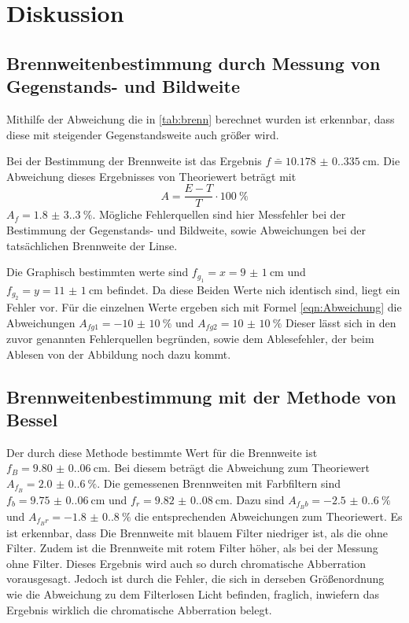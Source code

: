 \section{Diskussion}
\label{sec:Diskussion}
\subsection{Brennweitenbestimmung durch Messung von Gegenstands- und Bildweite}
Mithilfe der Abweichung die in \ref{tab:brenn} berechnet wurden ist erkennbar, dass diese mit steigender Gegenstandsweite auch größer wird.

\noindent Bei der Bestimmung der Brennweite ist das Ergebnis $f \bar=\qty{10.178(0.335)}{\centi\meter}$. 
Die Abweichung dieses Ergebnisses von Theoriewert beträgt mit 
\begin{equation}
    A=\frac{E-T}{T} \cdot \qty{100}{\percent}
    \label{eqn:Abweichung}
\end{equation}
$A_f=\qty{1.8(3.3)}{\percent}$.
Mögliche Fehlerquellen sind hier Messfehler bei der Bestimmung der Gegenstands- und Bildweite, sowie Abweichungen bei der tatsächlichen Brennweite der Linse.

\noindent Die Graphisch bestimmten werte sind $f_{g_1}=x=\qty{9(1)}{\centi\meter}$ und $f_{g_2}=y=\qty{11(1)}{\centi\meter}$ befindet.
Da diese Beiden Werte nich identisch sind, liegt ein Fehler vor.
Für die einzelnen Werte ergeben sich mit Formel \ref{eqn:Abweichung} die Abweichungen $A_{fg1}=\qty{-10(10)}{\percent}$ und $A_{fg2}=\qty{10(10)}{\percent}$
Dieser lässt sich in den zuvor genannten Fehlerquellen begründen, sowie dem Ablesefehler, der beim Ablesen von der Abbildung noch dazu kommt.

\subsection{Brennweitenbestimmung mit der Methode von Bessel}
Der durch diese Methode bestimmte Wert für die Brennweite ist $f_{B}=\qty{9.80(0.06)}{\centi\meter}$.
Bei diesem beträgt die Abweichung zum Theoriewert $A_{f_B}=\qty{2.0(0.6)}{\percent}$.
Die gemessenen Brennweiten mit Farbfiltern sind $f_b=\qty{9.75(0.06)}{\centi\meter}$ und $f_r=\qty{9.82(0.08)}{\centi\meter}$.
Dazu sind $A_{f_Bb}=\qty{-2.5(0.6)}{\percent}$ und $A_{f_Br}=\qty{-1.8(0.8)}{\percent}$ die entsprechenden Abweichungen zum Theoriewert.
Es ist erkennbar, dass Die Brennweite mit blauem Filter niedriger ist, als die ohne Filter.
Zudem ist die Brennweite mit rotem Filter höher, als bei der Messung ohne Filter.
Dieses Ergebnis wird auch so durch chromatische Abberration vorausgesagt.
Jedoch ist durch die Fehler, die sich in derseben Größenordnung wie die Abweichung zu dem Filterlosen Licht befinden, fraglich, inwiefern das Ergebnis wirklich die chromatische Abberration belegt.


